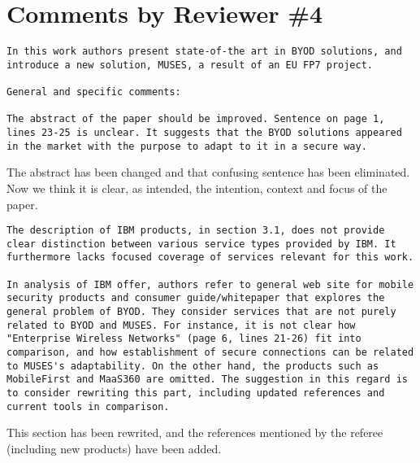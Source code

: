 \documentclass[preprint]{elsarticle}
\begin{document}
\section{Comments by Reviewer \#4}

\begin{verbatim}
In this work authors present state-of-the art in BYOD solutions, and introduce a new solution, MUSES, a result of an EU FP7 project.

General and specific comments:

The abstract of the paper should be improved. Sentence on page 1,
lines 23-25 is unclear. It suggests that the BYOD solutions appeared
in the market with the purpose to adapt to it in a secure way. 
\end{verbatim}

The abstract has been changed and that confusing sentence has been
eliminated. Now we think it is clear, as intended, the intention,
context and focus of
the paper. 

\begin{verbatim}
The description of IBM products, in section 3.1, does not provide clear distinction between various service types provided by IBM. It furthermore lacks focused coverage of services relevant for this work.

In analysis of IBM offer, authors refer to general web site for mobile security products and consumer guide/whitepaper that explores the general problem of BYOD. They consider services that are not purely related to BYOD and MUSES. For instance, it is not clear how "Enterprise Wireless Networks" (page 6, lines 21-26) fit into comparison, and how establishment of secure connections can be related to MUSES's adaptability. On the other hand, the products such as MobileFirst and MaaS360 are omitted. The suggestion in this regard is to consider rewriting this part, including updated references and current tools in comparison.
\end{verbatim}

This section has been rewrited, and the references mentioned by the referee (including new products) have been added. %
\end{document}
